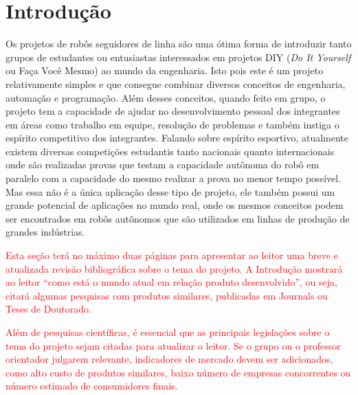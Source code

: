 \chapter[Introdução]{Introdução}

Os projetos de robôs seguidores de linha são uma ótima forma de introduzir tanto grupos de estudantes ou entusiastas interessados em projetos DIY (\textit{Do It Yourself} ou Faça Você Mesmo) ao mundo da engenharia. Isto pois este é um projeto relativamente simples e que consegue combinar diversos conceitos de engenharia, automação e programação. Além desses conceitos, quando feito em grupo, o projeto tem a capacidade de ajudar no desenvolvimento pessoal dos integrantes em áreas como trabalho em equipe, resolução de problemas e também instiga o espírito competitivo dos integrantes. Falando sobre espírito esportivo, atualmente existem diversas competições estudantis tanto nacionais quanto internacionais onde são realizadas provas que testam a capacidade autônoma do robô em paralelo com a capacidade do mesmo realizar a prova no menor tempo possível. Mas essa não é a única aplicação desse tipo de projeto, ele também possui um grande potencial de aplicações no mundo real, onde os mesmos conceitos podem ser encontrados em robôs autônomos que são utilizados em linhas de produção de grandes indústrias.

\textcolor{red}{Esta seção terá no máximo duas páginas para apresentar ao leitor uma breve e atualizada revisão bibliográfica sobre o tema do projeto. A Introdução mostrará ao leitor “como está o mundo atual em relação produto desenvolvido”, ou seja, citará algumas pesquisas com produtos similares, publicadas em Journals ou Teses de Doutorado.}




\textcolor{red}{Além de pesquisas científicas, é essencial que as principais legislações sobre o tema do projeto sejam citadas para atualizar o leitor. Se o grupo ou o professor orientador julgarem relevante, indicadores de mercado devem ser adicionados, como alto custo de produtos similares, baixo número de empresas concorrentes ou número estimado de consumidores finais.}

